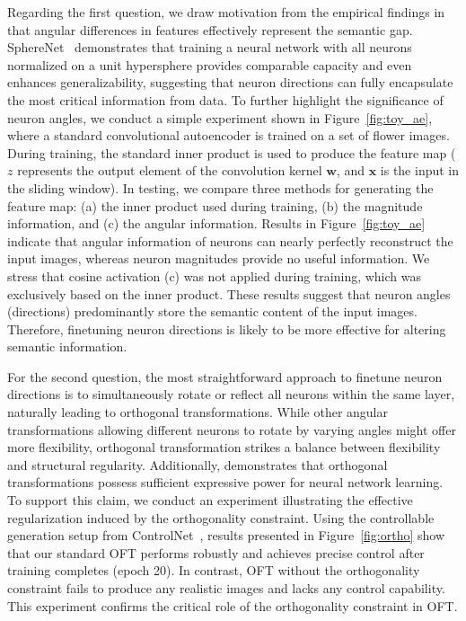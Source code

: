 Regarding the first question, we draw motivation from the empirical findings in \cite{liu2018decoupled,chen2020angular} that angular differences in features effectively represent the semantic gap. SphereNet~\cite{liu2017deep} demonstrates that training a neural network with all neurons normalized on a unit hypersphere provides comparable capacity and even enhances generalizability, suggesting that neuron directions can fully encapsulate the most critical information from data. To further highlight the significance of neuron angles, we conduct a simple experiment shown in Figure~\ref{fig:toy_ae}, where a standard convolutional autoencoder is trained on a set of flower images. During training, the standard inner product is used to produce the feature map ($z$ represents the output element of the convolution kernel $\bm{w}$, and $\bm{x}$ is the input in the sliding window). In testing, we compare three methods for generating the feature map: (a) the inner product used during training, (b) the magnitude information, and (c) the angular information. Results in Figure~\ref{fig:toy_ae} indicate that angular information of neurons can nearly perfectly reconstruct the input images, whereas neuron magnitudes provide no useful information. We stress that cosine activation (c) was not applied during training, which was exclusively based on the inner product. These results suggest that neuron angles (directions) predominantly store the semantic content of the input images. Therefore, finetuning neuron directions is likely to be more effective for altering semantic information.

For the second question, the most straightforward approach to finetune neuron directions is to simultaneously rotate or reflect all neurons within the same layer, naturally leading to orthogonal transformations. While other angular transformations allowing different neurons to rotate by varying angles might offer more flexibility, orthogonal transformation strikes a balance between flexibility and structural regularity. Additionally, \cite{liu2021orthogonal} demonstrates that orthogonal transformations possess sufficient expressive power for neural network learning. To support this claim, we conduct an experiment illustrating the effective regularization induced by the orthogonality constraint. Using the controllable generation setup from ControlNet~\cite{zhang2023adding}, results presented in Figure~\ref{fig:ortho} show that our standard OFT performs robustly and achieves precise control after training completes (epoch 20). In contrast, OFT without the orthogonality constraint fails to produce any realistic images and lacks any control capability. This experiment confirms the critical role of the orthogonality constraint in OFT.

